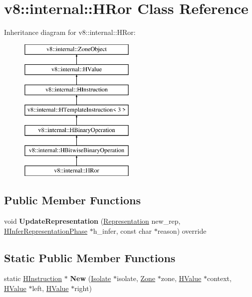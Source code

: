 \hypertarget{classv8_1_1internal_1_1_h_ror}{}\section{v8\+:\+:internal\+:\+:H\+Ror Class Reference}
\label{classv8_1_1internal_1_1_h_ror}
Inheritance diagram for v8\+:\+:internal\+:\+:H\+Ror\+:\begin{figure}[H]
\begin{center}
\leavevmode
\includegraphics[height=7.000000cm]{classv8_1_1internal_1_1_h_ror}
\end{center}
\end{figure}
\subsection*{Public Member Functions}
\begin{DoxyCompactItemize}
\item 
void {\bfseries Update\+Representation} (\hyperlink{classv8_1_1internal_1_1_representation}{Representation} new\+\_\+rep, \hyperlink{classv8_1_1internal_1_1_h_infer_representation_phase}{H\+Infer\+Representation\+Phase} $\ast$h\+\_\+infer, const char $\ast$reason) override\hypertarget{classv8_1_1internal_1_1_h_ror_abad66df7c42a2a8edfaa45f4d33d9211}{}\label{classv8_1_1internal_1_1_h_ror_abad66df7c42a2a8edfaa45f4d33d9211}

\end{DoxyCompactItemize}
\subsection*{Static Public Member Functions}
\begin{DoxyCompactItemize}
\item 
static \hyperlink{classv8_1_1internal_1_1_h_instruction}{H\+Instruction} $\ast$ {\bfseries New} (\hyperlink{classv8_1_1internal_1_1_isolate}{Isolate} $\ast$isolate, \hyperlink{classv8_1_1internal_1_1_zone}{Zone} $\ast$zone, \hyperlink{classv8_1_1internal_1_1_h_value}{H\+Value} $\ast$context, \hyperlink{classv8_1_1internal_1_1_h_value}{H\+Value} $\ast$left, \hyperlink{classv8_1_1internal_1_1_h_value}{H\+Value} $\ast$right)\hypertarget{classv8_1_1internal_1_1_h_ror_acd3f79666ea33a37a90569c3d04b9503}{}\label{classv8_1_1internal_1_1_h_ror_acd3f79666ea33a37a90569c3d04b9503}

\end{DoxyCompactItemize}
